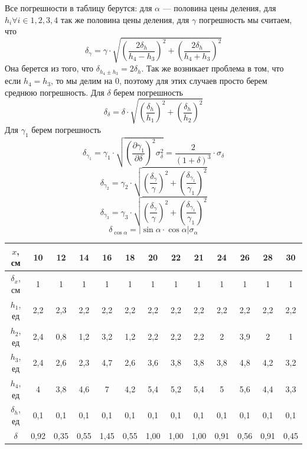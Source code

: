\documentclass[a4paper, 12pt]{article}%
\begin{document}
\begin{enumerate}
Все погрешности в таблицу берутся: для $\alpha$ --- половина цены деления, для $h_i \forall i \in {1, 2, 3, 4}$ так же половина цены деления, для $\gamma$ погрешность мы считаем, что 
\[\delta_{\gamma} = \gamma \cdot \sqrt{\left(\frac{2\delta_h}{h_4 - h_3}\right)^2 + \left(\frac{2\delta_h}{h_4 + h_3}\right)^2}\]
Она берется из того, что $\delta_{h_4 \pm h_3} = 2 \delta_h$. Так же возникает проблема в том, что если $h_4 = h_3$, то мы делим на 0, поэтому для этих случаев просто берем среднюю погрешность. Для $\delta$ берем погрешность 
\[\delta_{\delta} = \delta \cdot \sqrt{\left(\frac{\delta_{h}}{h_1}\right)^2 + \left(\frac{\delta_h}{h_2}\right)^2}\]
Для $\gamma_1$ берем погрешность 
\[\delta_{\gamma_1} = \gamma_1 \cdot \sqrt{ \left(\dfrac{\partial \gamma_1}{\partial \delta}\right)^2 \sigma_{\delta}^2} = \dfrac{2}{(1+\delta)^3}\cdot \sigma_{\delta}\]
\[\delta_{\gamma_2} = \gamma_2 \cdot \sqrt{\left(\frac{\delta_{\gamma}}{\gamma}\right)^2 + \left(\frac{\delta_{\gamma_1}}{\gamma_1}\right)^2}\]
\[\delta_{\gamma_3} = \gamma_3 \cdot \sqrt{\left(\frac{\delta_{\gamma}}{\gamma}\right)^2 + \left(\frac{\delta_{\gamma_1}}{\gamma_1}\right)^2}\]
\[\delta_{\cos\alpha} = \left| \sin \alpha \cdot \cos \alpha \right| \sigma_{\alpha}\]
\begin{table}[h!]
\begin{center}
\begin{tabular}{|c|c|c|c|c|c|c|c|c|c|c|c|c|}
\hline
$x$, см             & 10   & 12   & 14   & 16   & 18   & 20   & 22   & 21   & 24   & 26   & 28   & 30   \\ \hline
$\delta_x$, см      & 1    & 1    & 1    & 1    & 1    & 1    & 1    & 1    & 1    & 1    & 1    & 1    \\ \hline
$h_1$, ед           & 2,2  & 2,3  & 2,2  & 2,2  & 2,2  & 2,2  & 2,2  & 2,2  & 2,2  & 2,2  & 2,2  & 2,2  \\ \hline
$h_2$, ед           & 2,4  & 0,8  & 1,2  & 3,2  & 1,2  & 2,2  & 2,2  & 2,2  & 2    & 3,9  & 2    & 1    \\ \hline
$h_3$, ед           & 2,4  & 2,6  & 2,3  & 4,7  & 2,6  & 3,6  & 3,8  & 3,8  & 3,8  & 4,8  & 4,2  & 3,2  \\ \hline
$h_4$, ед           & 4    & 3,8  & 4,6  & 7    & 4,2  & 5,4  & 5,2  & 5,4  & 5    & 5,6  & 4,4  & 3,3  \\ \hline
$\delta_h$, ед      & 0,1  & 0,1  & 0,1  & 0,1  & 0,1  & 0,1  & 0,1  & 0,1  & 0,1  & 0,1  & 0,1  & 0,1  \\ \hline
$\delta$            & 0,92 & 0,35 & 0,55 & 1,45 & 0,55 & 1,00 & 1,00 & 1,00 & 0,91 & 0,56 & 0,91 & 0,45 \\ \hline

\end{tabular}
\end{center}
\end{table}
\end{enumerate}
\end{document}
